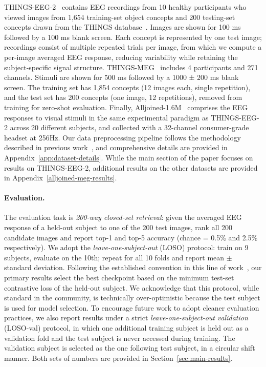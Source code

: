 \documentclass{article}
\begin{document}
THINGS-EEG-2~\cite{gifford2022things} contains EEG recordings from 10 healthy participants who viewed images from 1,654 training-set object concepts and 200 testing-set concepts drawn from the THINGS database~\cite{hebart2019things}. Images are shown for 100 ms followed by a 100 ms blank screen. Each concept is represented by one test image; recordings consist of multiple repeated trials per image, from which we compute a per-image averaged EEG response, reducing variability while retaining the subject-specific signal structure. THINGS-MEG~\cite{hebart2025thingsmeg} includes 4 participants and 271 channels. Stimuli are shown for 500 ms followed by a 1000 ± 200 ms blank screen. The training set has 1,854 concepts (12 images each, single repetition), and the test set has 200 concepts (one image, 12 repetitions), removed from training for zero-shot evaluation. Finally, Alljoined-1.6M~\cite{xu2025alljoined} comprises the EEG responses to visual stimuli in the same experimental paradigm as THINGS-EEG-2 across 20 different subjects, and collected with a 32-channel consumer-grade headset at 256Hz. Our data preprocessing pipeline follows the methodology described in previous work~\cite{song2024nice,li2024atm,wu2025ubp}, and comprehensive details are provided in Appendix~\ref{app:dataset-details}. While the main section of the paper focuses on results on THINGS-EEG-2, additional results on the other datasets are provided in Appendix~\ref{alljoined-meg-results}.



\paragraph{Evaluation.} The evaluation task is \emph{200-way closed-set retrieval}: given the averaged EEG response of a held-out subject to one of the 200 test images, rank all 200 candidate images and report top-1 and top-5 accuracy (chance = 0.5\% and 2.5\% respectively). We adopt the \emph{leave-one-subject-out} (LOSO) protocol: train on 9 subjects, evaluate on the 10th; repeat for all 10 folds and report mean $\pm$ standard deviation. Following the established convention in this line of work~\cite{zhang2025neurobridge,du2025shallow,huang2026sattc}, our primary results select the best checkpoint based on the minimum test-set contrastive loss of the held-out subject. We acknowledge that this protocol, while standard in the community, is technically over-optimistic because the test subject is used for model selection. To encourage future work to adopt cleaner evaluation practices, we also report results under a strict \emph{leave-one-subject-out validation} (LOSO-val) protocol, in which one additional training subject is held out as a validation fold and the test subject is never accessed during training. The validation subject is selected as the one following test subject, in a circular shift manner. Both sets of numbers are provided in Section~\ref{sec:main-results}.
\end{document}
